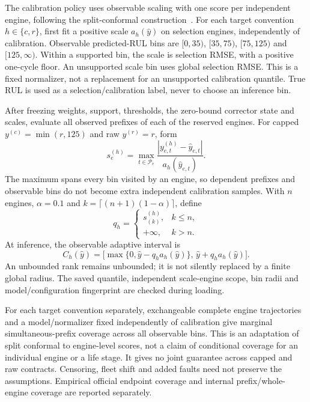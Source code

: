 The calibration policy uses observable scaling with one score per independent
engine, following the split-conformal construction~\cite{angelopoulos2021gentle}.
For each target convention $h\in\{c,r\}$, first fit a positive scale
$a_h(\widehat y)$ on selection engines, independently of calibration. Observable
predicted-RUL bins are $[0,35)$, $[35,75)$, $[75,125)$ and $[125,\infty)$.
Within a supported bin, the scale is selection RMSE, with a positive one-cycle
floor. An unsupported scale bin uses global selection RMSE. This is a fixed
normalizer, not a replacement for an unsupported calibration quantile.
True RUL is used as a selection/calibration label, never to choose an inference
bin.

After freezing weights, support, thresholds, the zero-bound corrector state and
scales, evaluate all
observed prefixes of each of the \CurrentCalibrationEngines{} reserved engines.
For capped $y^{(c)}=\min(r,125)$ and raw $y^{(r)}=r$, form
\begin{equation}
 s_e^{(h)}=\max_{t\in\mathcal P_e}
 \frac{|y_{e,t}^{(h)}-\widehat y_{e,t}|}{a_h(\widehat y_{e,t})}.
 \label{eq:normalized_engine_score}
\end{equation}
The maximum spans every bin visited by an engine, so dependent prefixes and
observable bins do not become extra independent calibration samples.
With $n$ engines, $\alpha=0.1$ and $k=\lceil(n+1)(1-\alpha)\rceil$, define
\begin{equation}
 q_h=\begin{cases}s_{(k)}^{(h)},&k\leq n,\\+\infty,&k>n.\end{cases}
\end{equation}
At inference, the observable adaptive interval is
\begin{equation}
 C_h(\widehat y)=\big[\max\{0,\widehat y-q_h a_h(\widehat y)\},\,
 \widehat y+q_h a_h(\widehat y)\big].
 \label{eq:adaptive_engine_interval}
\end{equation}
An unbounded rank remains unbounded; it is not silently replaced by a finite
global radius. The saved quantile, independent scale-engine scope, bin radii
and model/configuration fingerprint are checked during loading.

For each target convention separately, exchangeable complete engine
trajectories and a model/normalizer fixed independently of calibration give
marginal simultaneous-prefix coverage across all observable bins. This is an
adaptation of split conformal to engine-level scores, not a claim of conditional
coverage for an individual engine or a life stage. It gives no joint guarantee
across capped and raw contracts. Censoring, fleet shift and added faults need
not preserve the assumptions. Empirical official endpoint coverage and
internal prefix/whole-engine coverage are reported separately.
